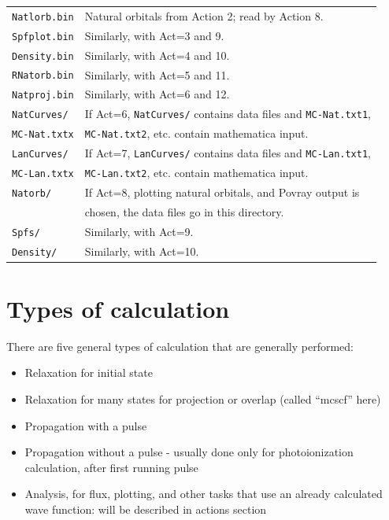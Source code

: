 \documentclass[10pt,leqno, oneside]{book}
\begin{document}
{\small
\begin{tabular}{ll}
\verb#Natlorb.bin#  & Natural orbitals from Action 2; read by Action 8. \\
\verb#Spfplot.bin#  & Similarly, with Act=3 and 9. \\
\verb#Density.bin# & Similarly, with Act=4 and 10. \\
\verb#RNatorb.bin#  & Similarly, with Act=5 and 11. \\
\verb#Natproj.bin#  & Similarly, with Act=6 and 12. \\
\verb#NatCurves/# & If Act=6, \verb#NatCurves/# contains data files and \verb#MC-Nat.txt1#,  \\
\verb#MC-Nat.txt#{\footnotesize \verb#x#} & \quad \verb#MC-Nat.txt2#, etc. contain mathematica input. \\
\verb#LanCurves/# & If Act=7, \verb#LanCurves/# contains data files and \verb#MC-Lan.txt1#, \\
\verb#MC-Lan.txt#{\footnotesize \verb#x#} & \quad  \verb#MC-Lan.txt2#, etc. contain mathematica input. \\
\verb#Natorb/# &  If Act=8, plotting natural orbitals, and Povray output is \\
& \quad chosen, the data files go  in this directory. \\
\verb#Spfs/# & Similarly, with Act=9. \\
\verb#Density/# & Similarly, with Act=10. \\
\end{tabular}
}

\chapter{Types of calculation}


There are five general types of calculation that are generally performed: 
\begin{itemize}
\item{Relaxation for initial state}
\item{Relaxation for many states for projection or overlap (called ``mcscf'' here)}
\item{Propagation with a pulse}
\item{Propagation without a pulse - usually done only for photoionization calculation, after first running pulse}
\item{Analysis, for flux, plotting, and other tasks that use an already calculated wave function: will be described in actions section}
\end{itemize}
\end{document}

